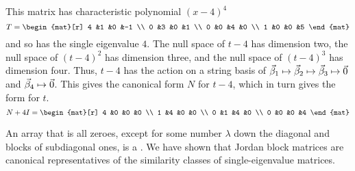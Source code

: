 \begin{example}
This matrix has characteristic polynomial \( (x-4)^4 \) 
\begin{equation*}
  T=
  \begin{mat}[r]
    4  &1  &0  &-1  \\
    0  &3  &0  &1   \\
    0  &0  &4  &0   \\
    1  &0  &0  &5
   \end{mat}
\end{equation*}
and so has the single eigenvalue $4$.
The
null space of $t-4$ has dimension two, the null space of $(t-4)^2$
has dimension three, and the null space of $(t-4)^3$ has dimension four.
Thus, $t-4$ has the action on a string basis of
$\vec{\beta}_1\mapsto\vec{\beta}_2\mapsto\vec{\beta}_3\mapsto\vec{0}$ and
$\vec{\beta}_4\mapsto\vec{0}$.
This gives the canonical form $N$ for $t-4$, which in turn gives the
form for \( t \).
\begin{equation*}
  N+4I=
  \begin{mat}[r]
    4  &0  &0  &0   \\
    1  &4  &0  &0   \\
    0  &1  &4  &0   \\
    0  &0  &0  &4
   \end{mat}
\end{equation*}
\end{example}

An array that is all zeroes, except for some number $\lambda$
down the diagonal and blocks of subdiagonal ones, is a 
.
We have shown that Jordan block matrices are
canonical representatives of the similarity classes of single-eigenvalue
matrices.

